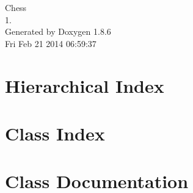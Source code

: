 \documentclass[twoside]{book}
\newcommand{\clearemptydoublepage}{%
  \newpage{\pagestyle{empty}\cleardoublepage}%
}
\begin{document}
\hypersetup{pageanchor=false}
\begin{titlepage}
\vspace*{7cm}
\begin{center}%
{\Large Chess \\[1ex]\large 1. }\\
\vspace*{1cm}
{\large Generated by Doxygen 1.8.6}\\
\vspace*{0.5cm}
{\small Fri Feb 21 2014 06:59:37}\\
\end{center}
\end{titlepage}
\clearemptydoublepage
\tableofcontents
\clearemptydoublepage
{}
\hypersetup{pageanchor=true}

\chapter{Hierarchical Index}

\chapter{Class Index}

\chapter{Class Documentation}






























\newpage
{}
{}
\printindex
\end{document}
